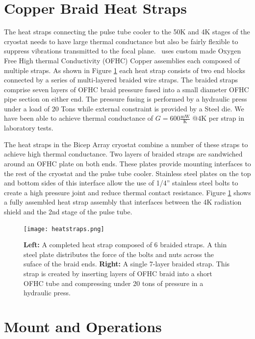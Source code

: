\documentclass[]{spie}  %
\begin{document}
\section{Copper Braid Heat Straps}

The heat straps connecting the pulse tube cooler to the 50K and 4K stages of
the cryostat needs to have large thermal conductance but also be fairly
flexible to suppress vibrations transmitted to the focal plane. \biceparray\ 
uses custom made Oxygen Free High thermal Conductivity (OFHC) Copper
assemblies each composed of multiple straps. As shown
in Figure \ref{fig:heatstrap} each heat strap consists of two end blocks
connected by a series of multi-layered braided wire straps. The braided straps
comprise seven layers of OFHC braid pressure fused into a small diameter OFHC
pipe section on either end. The pressure fusing is performed by a hydraulic
press under a load of 20 Tons while external constraint is provided by a Steel
die. We have been able to achieve thermal conductance of $G=600
\frac{\text{mW}}{\text{K}} \text{  @}4\text{K}$ per strap in laboratory tests.

The heat straps in the Bicep Array cryostat combine a number of these straps
to achieve high thermal conductance. Two layers of braided straps are
sandwiched around an OFHC plate on both ends. These plates provide mounting
interfaces to the rest of the cryostat and the pulse tube cooler. Stainless
steel plates on the top and bottom sides of this interface allow the use of
1/4'' stainless steel bolts to create a high pressure joint and reduce thermal
contact resistance. Figure \ref{fig:heatstrap} shows a fully assembled heat
strap assembly that interfaces between the 4K radiation shield and the 2nd
stage of the pulse tube.

\clearpage


\begin{figure}[ht]
\center
\texttt{[image: heatstraps.png]}
\caption{\textbf{Left:} A completed heat strap composed of 6 braided straps. A thin steel plate distributes the force of the bolts and nuts across the suface of the braid ends. \textbf{Right:} A single 7-layer braided strap. This strap is created by inserting layers of OFHC braid into a short OFHC tube and compressing under 20 tons of pressure in a hydraulic press.}
\label{fig:heatstrap}
\end{figure}


\section{Mount and Operations}
\end{document}
